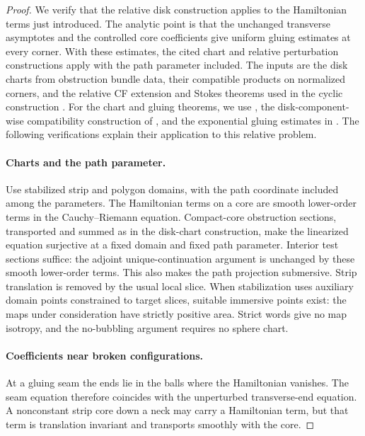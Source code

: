 \documentclass[11pt]{article}
\numberwithin{equation}{section}
\theoremstyle{definition}
\theoremstyle{remark}
\begin{document}
\begin{proof}
We verify that the relative disk construction applies to the
Hamiltonian terms just introduced.  The analytic point is that the
unchanged transverse asymptotes and the controlled core coefficients
give uniform gluing estimates at every corner.  With these estimates,
the cited chart and relative perturbation constructions apply with
the path parameter included.  The inputs are the disk charts
from obstruction bundle data, their compatible products on normalized
corners, and the relative CF extension and Stokes theorems used in
the cyclic construction
\cite[Sections~9--10 and~12]{AFOOO2026}.  For the chart and gluing
theorems, we use \cite[Theorem~7.1, Condition~7.11, and
Lemma~7.12]{FOOOChartsI}, the disk-component-wise compatibility
construction of \cite{FOOOChartsII}, and the exponential gluing
estimates in \cite[Assumption~3.12 and Theorems~3.13, 6.4,
8.16--8.17]{FOOOGluing}.  The following verifications explain their
application to this relative problem.

\paragraph{Charts and the path parameter.}
Use stabilized strip and polygon domains, with the path coordinate
included among the parameters.  The Hamiltonian terms on a core are
smooth lower-order terms in the Cauchy--Riemann equation.  Compact-core
obstruction sections, transported and summed as in the disk-chart
construction, make the linearized equation surjective at a fixed
domain and fixed path parameter.  Interior test sections suffice:
the adjoint unique-continuation argument is unchanged by these
smooth lower-order terms.  This also makes the path projection
submersive.  Strip translation is removed by the usual local slice.
When stabilization uses auxiliary domain points constrained to
target slices, suitable immersive points exist: the maps under
consideration have strictly positive area.  Strict words give no
map isotropy, and the no-bubbling argument requires no sphere chart.

\paragraph{Coefficients near broken configurations.}
At a gluing seam the ends lie in the balls where the Hamiltonian
vanishes.  The seam equation therefore coincides with the
unperturbed transverse-end equation.  A nonconstant strip core down
a neck may carry a Hamiltonian term, but that term is translation
invariant and transports smoothly with the core.


\end{proof}
\end{document}
